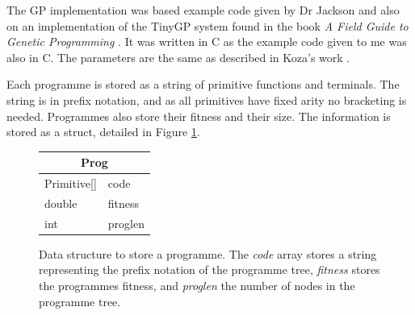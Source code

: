 \documentclass{article}
\begin{document}
		The GP implementation was based example code given by Dr Jackson and also on an implementation of the TinyGP system found in the book \textit{A Field Guide to Genetic
		Programming} \cite{poli_field_2008}. It was written in C as the example code given to me was also in C. The parameters are the same as described in Koza's work \cite{kinnear_generality_1993}.
		
		Each programme is stored as a string of primitive functions and terminals. The string is in prefix notation, and as all primitives have fixed arity no bracketing is needed. Programmes also store their fitness and their size. The information is stored as a struct, detailed in Figure \ref{struct:gp_prog}.
		
		\begin{figure}[h]
			\centering
			\begin{tabular}{|l l|}
				\hline
				\multicolumn{2}{|c|}{Prog}\\
				\hline
				Primitive[] & code \\
				double & fitness\\
				int & proglen\\
				\hline
			\end{tabular}
			\caption{Data structure to store a programme. The \textit{code} array stores a string representing the prefix notation of the programme tree, \textit{fitness} stores the programmes fitness, and \textit{proglen} the number of nodes in the programme tree.}
			
			\label{struct:gp_prog}
		\end{figure}
	
\end{document}
